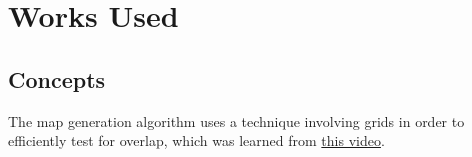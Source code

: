 \documentclass[10pt]{article}
\begin{document}



\section{Works Used}

\subsection{Concepts}

The map generation algorithm uses a technique involving grids in order to efficiently test for overlap, which was learned from
\href{https://www.youtube.com/watch?v=7WcmyxyFO7o}{this video}.




\end{document}
